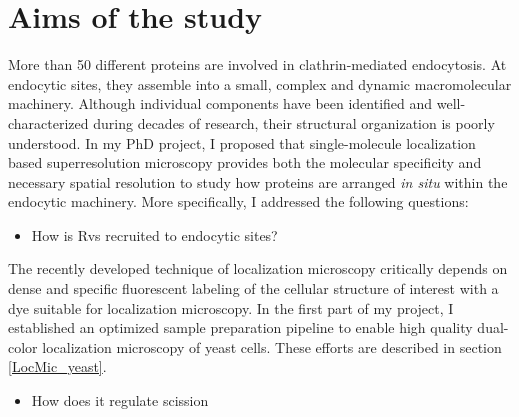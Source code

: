 
\chapter{Aims of the study} %

\label{Ch:Aims} %

More than 50 different proteins are involved in clathrin-mediated endocytosis. At endocytic sites, they assemble into a small, complex and dynamic macromolecular machinery. Although individual components have been identified and well-characterized during decades of research, their structural organization is poorly understood. In my PhD project, I proposed that single-molecule localization based superresolution microscopy provides both the molecular specificity and necessary spatial resolution to study how proteins are arranged \textit{in situ} within the endocytic machinery. More specifically, I addressed the following questions:

\begin{itemize}
	\item How is Rvs recruited to endocytic sites? 
\end{itemize}

The recently developed technique of localization microscopy critically depends on dense and specific fluorescent labeling of the cellular structure of interest with a dye suitable for localization microscopy. In the first part of my project, I established an optimized sample preparation pipeline to enable high quality dual-color localization microscopy of yeast cells. These efforts are described in section \ref{LocMic_yeast}.

\begin{itemize}
	\item How does it regulate scission 
\end{itemize}
